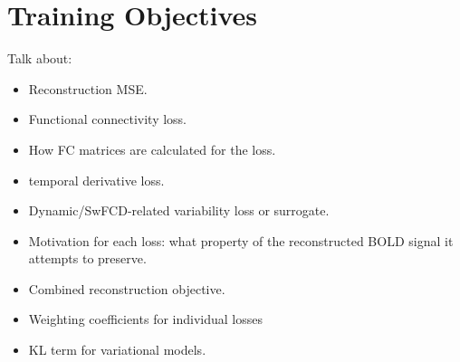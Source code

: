 \section{Training Objectives}
Talk about:
\begin{itemize}
    \item Reconstruction MSE.
    \item Functional connectivity loss.
    \item How FC matrices are calculated for the loss.
    \item temporal derivative loss.
    \item Dynamic/SwFCD-related variability loss or surrogate.
    \item Motivation for each loss: what property of the reconstructed BOLD signal it attempts to preserve.
    \item Combined reconstruction objective.
    \item Weighting coefficients for individual losses
    \item KL term for variational models.
\end{itemize}
